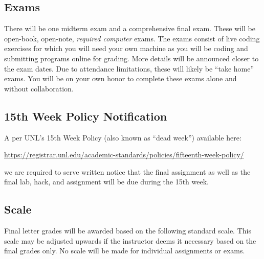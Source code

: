 \documentclass[12pt]{scrartcl}
\begin{document}
\subsection{Exams}

There will be one midterm exam and a comprehensive final exam.  These
will be open-book, open-note, \emph{required computer} exams.  The
exams consist of live coding exercises for which you will need your
own machine as you will be coding and submitting programs online for
grading.  More details will be announced closer to the exam dates.
Due to attendance limitations, these will likely be ``take home''
exams.  You will be on your own honor to complete these exams alone
and without collaboration.


\subsection{15th Week Policy Notification}
\label{subsection:deadweek}

A per UNL's 15th Week Policy (also known as ``dead week'') available here: 

\url{https://registrar.unl.edu/academic-standards/policies/fifteenth-week-policy/}

we are required to serve written notice that the final assignment
as well as the final lab, hack, and assignment will be due during the 15th 
week.

\subsection{Scale}

Final letter grades will be awarded based on the following 
standard scale. This scale may be adjusted upwards if the 
instructor deems it necessary based on the final grades only.  
No scale will be made for individual assignments or exams.
\end{document}

